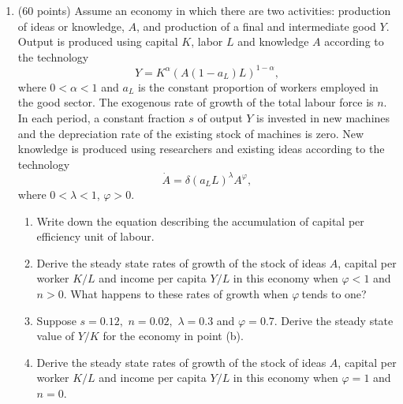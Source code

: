 \documentclass[12pt,a4paper]{article}
\begin{document}
\begin{enumerate}
\item (60 points) Assume an economy in which there are two activities:
  production of ideas or knowledge, $A$, and production of a final and
  intermediate good $Y$. Output is produced using capital $K$, labor $L$
  and knowledge $A$ according to the technology
  \begin{equation}
    Y=K^{\alpha }(A(1-a_{L})L)^{1-\alpha },
  \end{equation}
  where $0<\alpha <1$ and $a_{L}$ is the constant proportion of
  workers employed in the good sector. The exogenous rate of growth of
  the total labour force is $n.$ In each period, a constant fraction
  $s$ of output $Y$ is invested in new machines and the depreciation rate
  of the existing stock of machines is zero.
  New knowledge is produced using researchers and existing ideas
  according to the technology
  \begin{equation}
    \dot{A}=\delta (a_{L}L)^{\lambda }A^{\varphi },
  \end{equation}
  where $0<\lambda <1$, $\varphi >0$.

  \begin{enumerate}
  \item Write down the equation describing the accumulation of capital
    per efficiency unit of labour.  
  \item Derive the steady state rates of growth of the stock of ideas
    $A$, capital per worker $K/L$ and income per capita $Y/L$ in this
    economy when $%
    \varphi <1$ and $n>0$. What happens to these rates of growth when
    $\varphi \ $tends to one?
  
  \item Suppose $s=0.12,$ $n=0.02,$ $\lambda=0.3$ and $\varphi=0.7$.
    Derive the steady state value of $Y/K$ for the economy in point
    (b).
  
  \item Derive the steady state rates of growth of the stock of ideas
    $A$, capital per worker $K/L$ and income per capita $Y/L$ in this
    economy when $%
    \varphi =1$ and $n=0$.
  
    \end{enumerate}


\end{enumerate}
\end{document}
